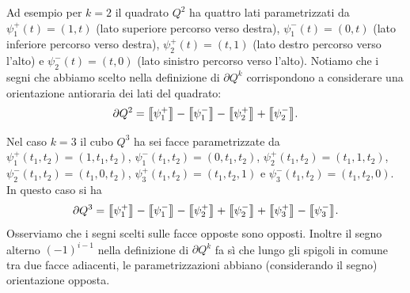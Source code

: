 Ad esempio per $k=2$ il quadrato $Q^2$ ha quattro lati parametrizzati 
da $\psi_1^+(t) = (1,t)$ (lato superiore percorso verso destra), 
$\psi_1^-(t) = (0,t)$ (lato inferiore percorso verso destra), 
$\psi_2^+(t) = (t,1)$ (lato destro percorso verso l'alto) e $\psi_2^-(t) = (t,0)$ (lato sinistro percorso verso l'alto).
Notiamo che i segni che abbiamo scelto nella definizione di $\partial Q^k$
corrispondono a considerare una orientazione antioraria dei lati del quadrato:
\[
 \partial Q^2 = {\left\llbracket \psi_1^+ \right\rrbracket} - {\left\llbracket \psi_1^- \right\rrbracket} - {\left\llbracket \psi_2^+ \right\rrbracket} + {\left\llbracket \psi_2^- \right\rrbracket}.
\]

Nel caso $k=3$ il cubo $Q^3$ ha sei facce parametrizzate da 
$\psi_1^+(t_1,t_2) = (1,t_1,t_2)$, 
$\psi_1^-(t_1,t_2) = (0,t_1,t_2)$, 
$\psi_2^+(t_1,t_2) = (t_1,1,t_2)$, 
$\psi_2^-(t_1,t_2) = (t_1,0,t_2)$, 
$\psi_3^+(t_1,t_2) = (t_1,t_2,1)$ e $\psi_3^-(t_1,t_2) = (t_1,t_2,0)$.
In questo caso si ha 
\[
\partial Q^3 = {\left\llbracket \psi_1^+ \right\rrbracket} - {\left\llbracket \psi_1^- \right\rrbracket} - {\left\llbracket \psi_2^+ \right\rrbracket} + {\left\llbracket \psi_2^- \right\rrbracket} + {\left\llbracket \psi_3^+ \right\rrbracket} - {\left\llbracket \psi_3^- \right\rrbracket}.
\]
Osserviamo che i segni scelti sulle facce opposte sono opposti.
Inoltre il segno alterno $(-1)^{i-1}$ nella definizione di $\partial Q^k$ 
fa sì che lungo gli spigoli in comune tra due facce adiacenti, le parametrizzazioni 
abbiano (considerando il segno) orientazione opposta.

